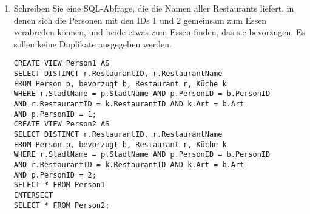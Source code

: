 \documentclass{bschlangaul-aufgabe}
\begin{document}
\begin{enumerate}

\item Schreiben Sie eine SQL-Abfrage, die die Namen aller Restaurants
liefert, in denen sich die Personen mit den IDs 1 und 2 gemeinsam zum
Essen verabreden können, und beide etwas zum Essen finden, das sie
bevorzugen. Es sollen keine Duplikate ausgegeben werden.

\begin{bAntwort}
\begin{verbatim}
CREATE VIEW Person1 AS
SELECT DISTINCT r.RestaurantID, r.RestaurantName
FROM Person p, bevorzugt b, Restaurant r, Küche k
WHERE r.StadtName = p.StadtName AND p.PersonID = b.PersonID
AND r.RestaurantID = k.RestaurantID AND k.Art = b.Art
AND p.PersonID = 1;
CREATE VIEW Person2 AS
SELECT DISTINCT r.RestaurantID, r.RestaurantName
FROM Person p, bevorzugt b, Restaurant r, Küche k
WHERE r.StadtName = p.StadtName AND p.PersonID = b.PersonID
AND r.RestaurantID = k.RestaurantID AND k.Art = b.Art
AND p.PersonID = 2;
SELECT * FROM Person1
INTERSECT
SELECT * FROM Person2;
\end{verbatim}
\end{bAntwort}

\end{enumerate}
\end{document}
